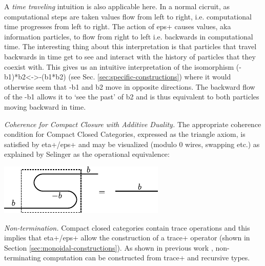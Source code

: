\documentclass[preprint]{sigplanconf}
\begin{document}
A \emph{time traveling} intuition is also applicable here.  In a
normal cicruit, as computational steps are taken values flow from left
to right, i.e. computational time progresses from left to right.  The
action of {{eps+}} causes values, aka information particles, to flow
from right to left i.e. backwards in computational time.  The
interesting thing about this interpretation is that particles that
travel backwards in time get to see and interact with the history of
particles that they coexist with. This gives us an intuitive
interpretation of the isomorphism {{(-b1)*b2<->-(b1*b2)}} (see
Sec. \ref{sec:specific-constructions}) where it would otherwise seem
that {{-b1}} and {{b2}} move in opposite directions. The backward flow
of the {{-b1}} allows it to `see the past' of {{b2}} and is thus
equivalent to both particles moving backward in time.

\emph{Coherence for Compact Closure with Additive Duality.}  The
appropriate coherence condition for Compact Closed Categories,
expressed as the triangle axiom, is satisfied by {{eta+}}/{{eps+}} and
may be visualized (modulo {{0}} wires, swapping etc.) as explained by
Selinger \cite{springerlink:10.1007/978-3-642-12821-94} as the
operational equivalence:

\begin{center}
  \includegraphics{diagrams/coherence.pdf}
\end{center}


\emph{Non-termination.}  Compact closed categories contain {{trace}}
operations and this implies that {{eta+}}/{{eps+}} allow the
construction of a {{trace+}} operator (shown in Section
\ref{sec:monoidal-constructions}).  As shown in previous work
\cite{infeffects}, non-terminating computation can be constructed from
     {{trace+}} and recursive types.

\end{document}
